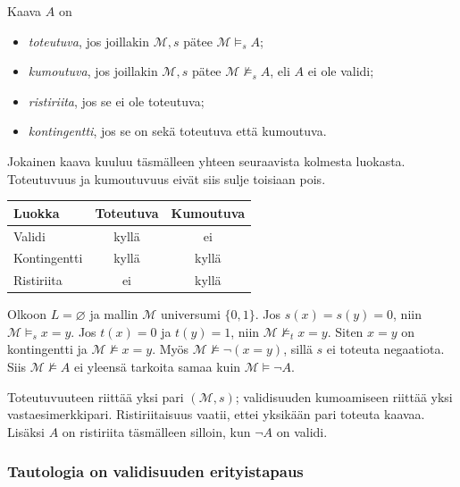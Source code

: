 \documentclass[11pt,a4paper]{amsart}
\begin{document}
\begin{definition}
  Kaava $A$ on
  \begin{itemize}
    \item \emph{toteutuva}, jos joillakin $\mathcal M,s$ pätee
      $\mathcal M\models_s A$;
    \item \emph{kumoutuva}, jos joillakin $\mathcal M,s$ pätee
      $\mathcal M\not\models_s A$, eli $A$ ei ole validi;
    \item \emph{ristiriita}, jos se ei ole toteutuva;
    \item \emph{kontingentti}, jos se on sekä toteutuva että kumoutuva.
  \end{itemize}
\end{definition}

Jokainen kaava kuuluu täsmälleen yhteen seuraavista kolmesta luokasta.
Toteutuvuus ja kumoutuvuus eivät siis sulje toisiaan pois.
\begin{center}
  \renewcommand{\arraystretch}{1.2}
  \begin{tabular}{lcc}
    \hline
    Luokka & Toteutuva & Kumoutuva\\
    \hline
    Validi & kyllä & ei\\
    Kontingentti & kyllä & kyllä\\
    Ristiriita & ei & kyllä\\
    \hline
  \end{tabular}
\end{center}

\begin{example}
  Olkoon $L=\varnothing$ ja mallin $\mathcal M$ universumi $\{0,1\}$.
  Jos $s(x)=s(y)=0$, niin $\mathcal M\models_s x=y$.
  Jos $t(x)=0$ ja $t(y)=1$, niin $\mathcal M\not\models_t x=y$.
  Siten $x=y$ on kontingentti ja $\mathcal M\not\models x=y$.
  Myös $\mathcal M\not\models\neg(x=y)$, sillä $s$ ei toteuta negaatiota.
  Siis $\mathcal M\not\models A$ ei yleensä tarkoita samaa kuin
  $\mathcal M\models\neg A$.
\end{example}

Toteutuvuuteen riittää yksi pari $(\mathcal M,s)$; validisuuden
kumoamiseen riittää yksi vastaesimerkkipari. Ristiriitaisuus vaatii,
ettei yksikään pari toteuta kaavaa. Lisäksi $A$ on ristiriita täsmälleen
silloin, kun $\neg A$ on validi.

\clearpage
\subsubsection{Tautologia on validisuuden erityistapaus}
\end{document}
